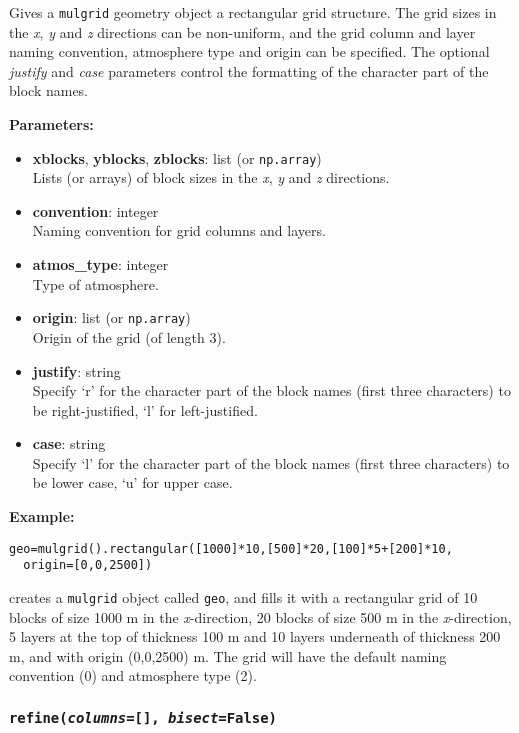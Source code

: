 Gives a \texttt{mulgrid} geometry object a rectangular grid structure.  The grid sizes in the \emph{x}, \emph{y} and \emph{z} directions can be non-uniform, and the grid column and layer naming convention, atmosphere type and origin can be specified.  The optional \emph{justify} and \emph{case} parameters control the formatting of the character part of the block names.

\textbf{Parameters:}
\begin{itemize}
\item \textbf{xblocks}, \textbf{yblocks}, \textbf{zblocks}: list (or \texttt{np.array})\\
  Lists (or arrays) of block sizes in the \emph{x}, \emph{y} and \emph{z} directions.
\item \textbf{convention}: integer\\
  Naming convention for grid columns and layers.
\item \textbf{atmos\_type}: integer\\
  Type of atmosphere.
\item \textbf{origin}: list (or \texttt{np.array})\\
  Origin of the grid (of length 3).
\item \textbf{justify}: string\\
  Specify `r' for the character part of the block names (first three characters) to be right-justified, `l' for left-justified.
\item \textbf{case}: string\\
  Specify `l' for the character part of the block names (first three characters) to be lower case, `u' for upper case.
\end{itemize}

\textbf{Example:}

\begin{verbatim}
geo=mulgrid().rectangular([1000]*10,[500]*20,[100]*5+[200]*10,
  origin=[0,0,2500])
\end{verbatim}

creates a \texttt{mulgrid} object called \texttt{geo}, and fills it with a rectangular grid of 10 blocks of size 1000 m in the \emph{x}-direction, 20 blocks of size 500 m in the \emph{x}-direction, 5 layers at the top of thickness 100 m and 10 layers underneath of thickness 200 m, and with origin (0,0,2500) m.  The grid will have the default naming convention (0) and atmosphere type (2).

\subsubsection{\texttt{refine(\emph{columns}=[], \emph{bisect}=False)}}

